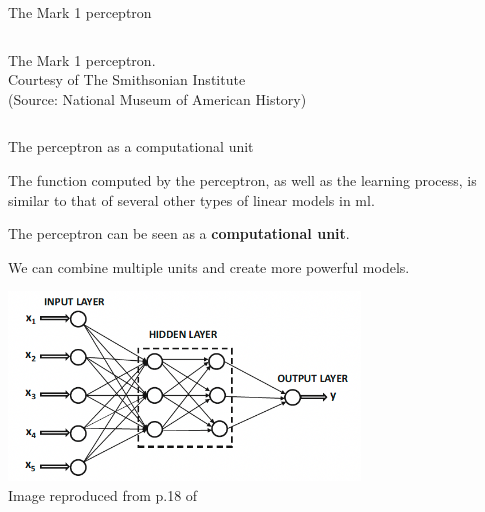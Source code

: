 \begin{frame}[t]{The Mark 1 perceptron}
\begin{columns}[t]
\begin{column}{0.50\textwidth}
\begin{center}
                {\tiny 
                The Mark 1 perceptron.\\
                \color{col:attribution} 
                Courtesy of The Smithsonian Institute\\ (Source: National Museum of American History)\\}
             \end{center}
        \end{column}
        \begin{column}{0.20\textwidth}
        \end{column}
      \end{columns}

\end{frame}

%
%
%

\begin{frame}[t]{The perceptron as a computational unit}

    The function computed by the \gls{perceptron},
    as well as the learning process, is similar to that of several
    other types of \glspl{linear model} in \gls{ml}.
    
    The \gls{perceptron} can be seen as a {\bf computational unit}.
    
    We can combine multiple units and create more powerful models.
    
    \begin{center}
        \includegraphics[width=0.70\textwidth]{./images/perceptron/combining_units.png}\\
        {\scriptsize \color{col:attribution} 
        Image reproduced from p.18 of \cite{Aggarwal:2018SpringerDL}}\\
     \end{center}
    
    
    \end{frame}

%
%
%

